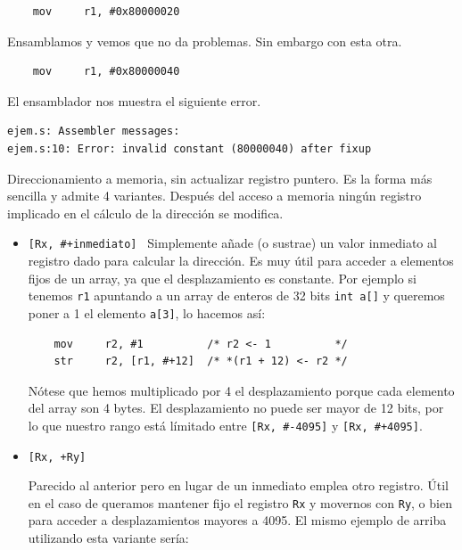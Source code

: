 \begin{descript}
\begin{lstlisting}
    mov     r1, #0x80000020
\end{lstlisting}
    Ensamblamos y vemos que no da problemas. Sin embargo con esta otra.
\begin{lstlisting}
    mov     r1, #0x80000040
\end{lstlisting}
    El ensamblador nos muestra el siguiente error.
\begin{lstlisting}
ejem.s: Assembler messages:
ejem.s:10: Error: invalid constant (80000040) after fixup
\end{lstlisting}

  \item[Direccionamiento a memoria, sin actualizar registro puntero.]
    Es la forma más sencilla y admite 4 variantes. Después del acceso
    a memoria ningún registro implicado en el cálculo de la dirección
    se modifica.
\begin{itemize}
  \item{\tt [Rx, \#+inmediato] \newline
            [Rx, \#-inmediato] \newline}
    Simplemente añade (o sustrae) un valor inmediato al registro dado
    para calcular la dirección. Es muy útil para acceder a elementos
    fijos de un array, ya que el desplazamiento es constante. Por
    ejemplo si tenemos {\tt r1} apuntando a un array de enteros de
    32 bits {\tt int a[]} y queremos poner a 1 el
    elemento {\tt a[3]}, lo hacemos así:

\begin{lstlisting}
    mov     r2, #1          /* r2 <- 1          */
    str     r2, [r1, #+12]  /* *(r1 + 12) <- r2 */
\end{lstlisting}

    Nótese que hemos multiplicado por 4 el desplazamiento porque cada
    elemento del array son 4 bytes. El desplazamiento no puede ser mayor
    de 12 bits, por lo que nuestro rango está límitado entre {\tt [Rx, \#-4095]}
    y {\tt [Rx, \#+4095]}.

  \item{\tt [Rx, +Ry] \newline
            [Rx, -Ry] \newline}

    Parecido al anterior pero en lugar de un inmediato emplea otro registro. Útil
    en el caso de queramos mantener fijo el registro {\tt Rx} y movernos con {\tt Ry},
    o bien para acceder a desplazamientos mayores a 4095. El mismo ejemplo de
    arriba utilizando esta variante sería:


\end{itemize}
\end{descript}
